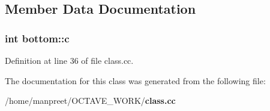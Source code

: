 \subsection{Member Data Documentation}
\subsubsection[{c}]{\setlength{\rightskip}{0pt plus 5cm}int bottom\-::c}\label{classbottom_a3a5c7cf54122860bcd8fc5ba5595d986}


Definition at line 36 of file class.\-cc.



The documentation for this class was generated from the following file\-:\begin{DoxyCompactItemize}
\item 
/home/manpreet/\-O\-C\-T\-A\-V\-E\-\_\-\-W\-O\-R\-K/{\bf class.\-cc}\end{DoxyCompactItemize}
